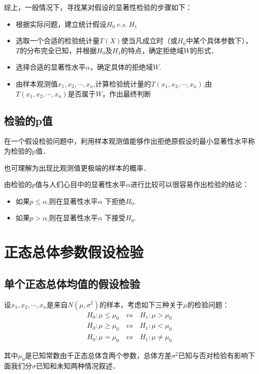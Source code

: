 综上，一般情况下，寻找某对假设的显著性检验的步骤如下：
\begin{itemize}
    \item 根据实际问题，建立统计假设$H_0 ~v.s.~ H_1 $
    \item 选取一个合适的检验统计量$T(X)$使当凡成立时（或$H_0$中某个具体参数下），$T$的分布完全已知，并根据$H_0$及$H_1$的特点，确定拒绝域$W$的形式．
    \item 选择合适的显著性水平$\alpha$，确定具体的拒绝域$W$.
    \item 由样本观测值$x_1, x_2, \cdots,x_n$,计算检验统计量的$T(x_1,x_2,\cdots,x_n)$,由$T(x_1,x_2,\cdots,x_n)$是否属于$W$，作出最终判断

\end{itemize}

\subsection{检验的p值}
\begin{definition}
    在一个假设检验问题中，利用样本观测值能够作出拒绝原假设的最小显著性水平称为检验的p值．
\end{definition}
也可理解为出现比观测值更极端的样本的概率．

由检验的$p$值与人们心目中的显著性水平$\alpha$进行比较可以很容易作出检验的结论：
\begin{itemize}
    \item 如果$p \leqslant \alpha$,则在显著性水平$\alpha$ 下拒绝$H_0$.
    \item 如果$p > \alpha$,则在显著性水平$\alpha$ 下接受$H_0$.
\end{itemize}
\section{正态总体参数假设检验}
\subsection{单个正态总体均值的假设检验}
设$x_{1},x_{2},\cdots,x_{n}$是来自$ N(\mu,\sigma^{2})$的样本，考虑如下三种关于$\mu$的检验问题：
\begin{align}
    H_0:\mu\leqslant\mu_0\quad vs \quad H_1:\mu>\mu_0 \\
    H_0:\mu\geqslant\mu_0\quad vs \quad H_1:\mu<\mu_0 \\
    H_0:\mu=\mu_0\quad vs \quad H_1:\mu\neq\mu_0
\end{align}

其中$\mu_0$是已知常数由千正态总体含两个参数，总体方差$\sigma^2$已知与否对检验有影响下面我们分$\sigma$已知和未知两种情况叙述．
